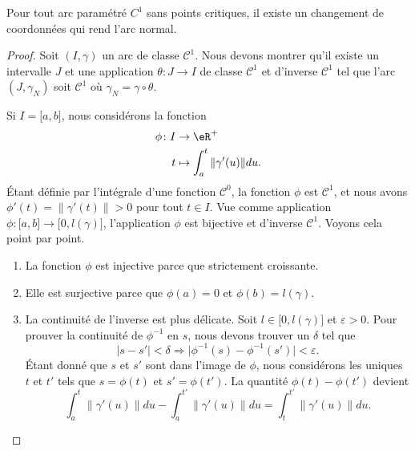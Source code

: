 \begin{proposition}     \label{PropExisteChmNorm}
	Pour tout arc paramétré $C^1$ sans points critiques, il existe un changement de coordonnées qui rend l'arc normal.
\end{proposition}

\begin{proof}
	Soit $(I,\gamma)$ un arc de classe $\mathcal{C}^1$. Nous devons montrer qu'il existe un intervalle $J$ et une application $\theta\colon J\to I$ de classe $\mathcal{C}^1$ et d'inverse $\mathcal{C}^1$ tel que l'arc $(J,\gamma_N)$ soit $\mathcal{C}^1$ où $\gamma_N=\gamma\circ\theta$.

	Si $I=\mathopen[ a ,b \mathclose]$, nous considérons la fonction
	\begin{equation}        \label{EqDevVarPhi}
		\begin{aligned}
			\phi\colon I & \to \eR^+                           \\
			t            & \mapsto \int_a^t\| \gamma'(u) \|du.
		\end{aligned}
	\end{equation}
	Étant définie par l'intégrale d'une fonction $\mathcal{C}^0$, la fonction $\phi$ est $\mathcal{C}^1$, et nous avons $\phi'(t)=\| \gamma'(t) \|>0$ pour tout $t\in I$. Vue comme application $\phi\colon \mathopen[ a , b \mathclose]\to \mathopen[ 0 , l(\gamma) \mathclose]$, l'application $\phi$ est bijective et d'inverse $\mathcal{C}^1$. Voyons cela point par point.
	\begin{enumerate}
		\item
		      La fonction $\phi$ est injective parce que strictement croissante.
		\item
		      Elle est surjective parce que $\phi(a)=0$ et $\phi(b)=l(\gamma)$.
		\item
		      La continuité de l'inverse est plus délicate. Soit $l\in\mathopen[ 0 , l(\gamma) \mathclose]$ et $\varepsilon>0$. Pour prouver la continuité de $\phi^{-1}$ en $s$, nous devons trouver un $\delta$ tel que
		      \begin{equation}
			      | s-s' |<\delta\Rightarrow\big| \phi^{-1}(s)-\phi^{-1}(s') \big|<\varepsilon.
		      \end{equation}
		      Étant donné que $s$ et $s'$ sont dans l'image de $\phi$, nous considérons les uniques $t$ et $t'$ tels que $s=\phi(t)$ et $s'=\phi(t')$. La quantité $\phi(t)-\phi(t')$ devient
		      \begin{equation}        \label{EqCondvpemuCont}
			      \int_a^t\big\| \gamma'(u) \big\|du-\int_a^{t'}\big\| \gamma'(u) \big\|du=\int_{t}^{t'}\big\| \gamma'(u) \big\|du.

\end{equation}
\end{enumerate}
\end{proof}

